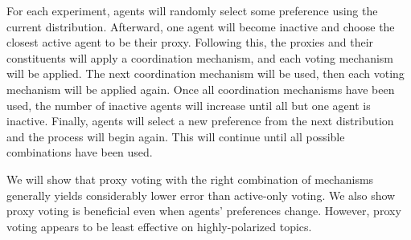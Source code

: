 For each experiment, agents will randomly select some preference using the current
distribution.
Afterward, one agent
will become inactive and choose the closest active agent to be their proxy.
Following this, the proxies and their constituents will apply a coordination
mechanism, and each voting mechanism will be applied.
The next coordination mechanism will be used, then each voting mechanism will be
applied again.
Once all coordination mechanisms have been used, the number of inactive agents will
increase until all but one agent is inactive.  
Finally, agents will select a new preference from the next distribution and the
process will begin again.
This will continue until all possible combinations have been used.  

We will show that proxy voting with the right combination of mechanisms generally
yields considerably lower error than active-only voting.
We also show proxy voting is beneficial even when agents' preferences change.
However, proxy voting appears to be least effective on highly-polarized topics.
